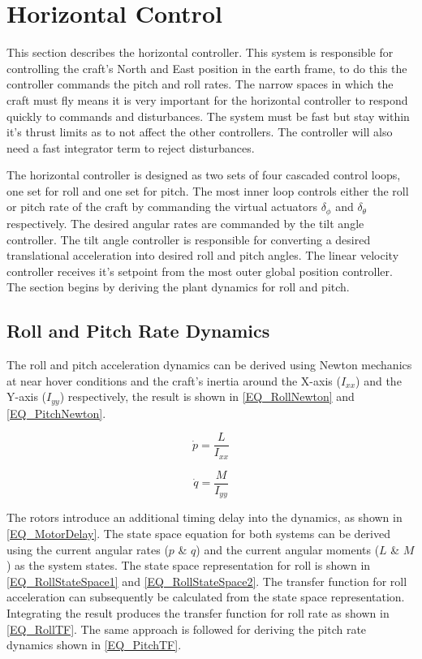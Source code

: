 	 
\section{Horizontal Control}
This section describes the horizontal controller. This system is responsible for controlling the craft's North and East position in the earth frame, to do this the controller commands the pitch and roll rates. The narrow spaces in which the craft must fly means it is very important for the horizontal controller to respond quickly to commands and disturbances. The system must be fast but stay within it's thrust limits as to not affect the other controllers. The controller will also need a fast integrator term to reject disturbances.

The horizontal controller is designed as two sets of four cascaded control loops, one set for roll and one set for pitch. The most inner loop controls either the roll or pitch rate of the craft by commanding the virtual actuators $\delta_\phi$ and $\delta_\theta$ respectively. The desired angular rates are commanded by the tilt angle controller. The tilt angle controller is responsible for converting a desired translational acceleration into desired roll and pitch angles. The linear velocity controller receives it's setpoint from the most outer global position controller. The section begins by deriving the plant dynamics for roll and pitch.
	
	\subsection{Roll and Pitch Rate Dynamics}
	The roll and pitch acceleration dynamics can be derived using Newton mechanics at near hover conditions and the craft's inertia around the X-axis ($I_{xx}$) and the Y-axis ($I_{yy}$) respectively, the result is shown in \eqref{EQ_RollNewton} and \eqref{EQ_PitchNewton}.
	
	\begin{equation}
	\label{EQ_RollNewton}
	\dot{p} = \dfrac{L}{I_{xx}}
	\end{equation}
	
	\begin{equation}
	\label{EQ_PitchNewton}
	\dot{q} = \dfrac{M}{I_{yy}}
	\end{equation}
	
	The rotors introduce an additional timing delay into the dynamics, as shown in \eqref{EQ_MotorDelay}. The state space equation for both systems can be derived using the current angular rates ($p$ \& $q$) and the current angular moments ($L$ \& $M$) as the system states. The state space representation for roll is shown in \eqref{EQ_RollStateSpace1} and \eqref{EQ_RollStateSpace2}. The transfer function for roll acceleration can subsequently be calculated from the state space representation. Integrating the result produces the transfer function for roll rate as shown in \eqref{EQ_RollTF}. The same approach is followed for deriving the pitch rate dynamics shown in \ref{EQ_PitchTF}.
	
